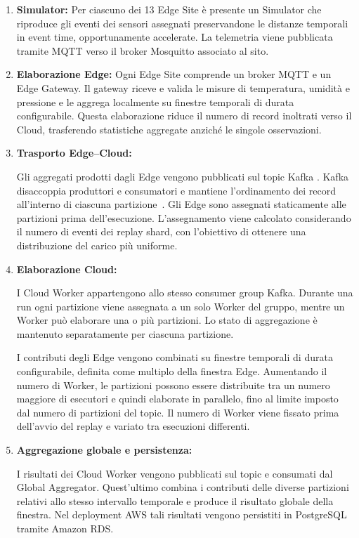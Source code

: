 \begin{enumerate}
    \item \textbf{Simulator:}
    Per ciascuno dei 13 Edge Site è presente un Simulator che riproduce gli
    eventi dei sensori assegnati preservandone le distanze temporali in
    event time, opportunamente accelerate. La telemetria viene pubblicata
    tramite MQTT verso il broker Mosquitto associato al sito.

    \item \textbf{Elaborazione Edge:}
    Ogni Edge Site comprende un broker MQTT e un Edge Gateway. Il gateway
    riceve e valida le misure di temperatura, umidità e pressione e le
    aggrega localmente su finestre temporali di durata configurabile. Questa elaborazione riduce il numero di record inoltrati verso il Cloud,
trasferendo statistiche aggregate anziché le singole osservazioni.

    \item \textbf{Trasporto Edge--Cloud:}

    Gli aggregati prodotti dagli Edge vengono pubblicati sul topic Kafka
    . Kafka disaccoppia produttori e consumatori e mantiene
    l'ordinamento dei record all'interno di ciascuna partizione~\cite{kafka}.
    Gli Edge sono assegnati staticamente alle partizioni prima dell'esecuzione.
    L'assegnamento viene calcolato considerando il numero di eventi dei replay
    shard, con l'obiettivo di ottenere una distribuzione del carico più uniforme.

    \item \textbf{Elaborazione Cloud:}

    I Cloud Worker appartengono allo stesso consumer group Kafka. Durante una
    run ogni partizione viene assegnata a un solo Worker del gruppo, mentre un
    Worker può elaborare una o più partizioni. Lo stato di aggregazione è
    mantenuto separatamente per ciascuna partizione.

    I contributi degli Edge vengono combinati su finestre temporali di durata
    configurabile, definita come multiplo della finestra Edge. Aumentando il
    numero di Worker, le partizioni possono essere distribuite tra un numero
    maggiore di esecutori e quindi elaborate in parallelo, fino al limite imposto
    dal numero di partizioni del topic. Il numero di Worker viene fissato prima
    dell'avvio del replay e variato tra esecuzioni differenti.

    \item \textbf{Aggregazione globale e persistenza:}

    I risultati dei Cloud Worker vengono pubblicati sul topic
     e consumati dal Global Aggregator.
    Quest'ultimo combina i contributi delle diverse partizioni relativi allo
    stesso intervallo temporale e produce il risultato globale della finestra.
    Nel deployment AWS tali risultati vengono persistiti in PostgreSQL tramite
    Amazon RDS.
\end{enumerate}

